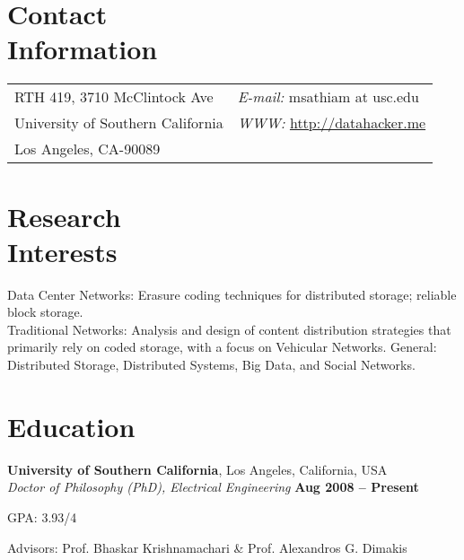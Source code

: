 \documentclass[margin,line]{resume}
\begin{document}
\begin{resume}


\section{\mysidestyle Contact\\Information}


\begin{tabular}{@{}p{4in}p{5in}}
RTH 419, 3710 McClintock Ave &  {\it E-mail:}  msathiam at usc.edu\\
University of Southern California & {\it WWW:} \href{http://datahacker.me}{http://datahacker.me} \\
Los Angeles, CA-90089 &      \\
\end{tabular}

    \section{\mysidestyle Research\\Interests}
	Data Center Networks: Erasure coding techniques for distributed storage; reliable block storage. \\
	Traditional Networks: Analysis and design of content distribution strategies that primarily rely on coded storage, with a focus on Vehicular Networks.
	General: Distributed Storage, Distributed Systems, Big Data, and Social Networks.
    \section{\mysidestyle Education}

    \textbf{University of Southern California}, Los Angeles, California, USA \\%
    \textsl{Doctor of Philosophy (PhD), Electrical Engineering} \hfill \textbf{ Aug 2008 -- Present}\vspace{-3mm}\\\vspace{-1mm}
    \begin{list2}
        \item GPA: 3.93/4
        \item Advisors:  Prof. Bhaskar Krishnamachari \& Prof. Alexandros G. Dimakis
    \end{list2}\vspace{-1.5mm}
    

\end{resume}
\end{document}
